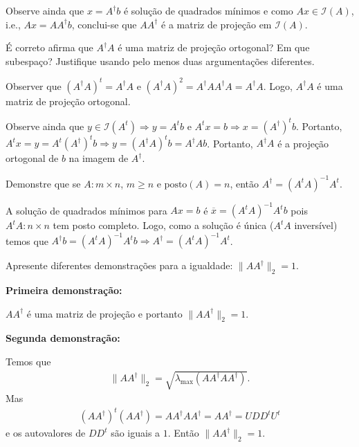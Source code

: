 \begin{questions}
\begin{solution}
        Observe ainda que $x = A^\dagger b$ \'{e} solu\c{c}\~{a}o de quadrados m\'{i}nimos e como $A x \in \mathcal{I}(A)$, i.e., $A x = A A^\dagger b$, conclui-se que $A A^\dagger$ \'{e} a matriz de proje\c{c}\~{a}o em $\mathcal{I}(A)$.
    \end{solution}

    \question \'{E} correto afirma que $A^\dagger A$ \'{e} uma matriz de proje\c{c}\~{a}o ortogonal? Em que subespa\c{c}o? Justifique usando pelo menos duas argumenta\c{c}\~{o}es diferentes.
    \begin{solution}
        Observer que $\left( A^\dagger A \right)^t = A^\dagger A$ e $\left( A^\dagger A \right)^2 = A^\dagger A A^\dagger A = A^\dagger A$. Logo, $A^\dagger A$ \'{e} uma matriz de proje\c{c}\~{a}o ortogonal.

        Observe ainda que $y \in \mathcal{I}(A^t) \Rightarrow y = A^t b$ e $A^t x = b \Rightarrow x = \left( A^\dagger \right)^t b$. Portanto, $A^t x = y = A^t \left( A^\dagger \right)^t b \Rightarrow y = \left( A^\dagger A \right)^t b = A^\dagger A b$. Portanto, $A^\dagger A$ \'{e} a proje\c{c}\~{a}o ortogonal de $b$ na imagem de $A^\dagger$.
    \end{solution}

    \question Demonstre que se $A : m \times n$, $m \geq n$ e $\textrm{posto}(A) = n$, ent\~{a}o $A^\dagger = (A^t A)^{-1} A^t$.
    \begin{solution}
        A solu\c{c}\~{a}o de quadrados m\'{i}nimos para $A x = b$ \'{e} $\overline{x} = \left( A^t A \right)^{-1} A^t b$ pois $A^t A : n \times n$ tem posto completo. Logo, como a solu\c{c}\~{a}o \'{e} \'{u}nica ($A^t A$ invers\'{i}vel) temos que $A^\dagger b = \left( A^t A \right)^{-1} A^t b \Rightarrow A^\dagger = \left( A^t A \right)^{-1} A^t$.
    \end{solution}

    \question Apresente diferentes demonstra\c{c}\~{o}es para a igualdade: $\| A A^\dagger \|_2 = 1$.
    \begin{solution}
        \textbf{Primeira demonstra\c{c}\~{a}o:}

        $A A^\dagger$ \'{e} uma matriz de proje\c{c}\~{a}o e portanto $\| A A^\dagger \|_2 = 1$.

        \textbf{Segunda demonstra\c{c}\~{a}o:}

        Temos que
        \begin{align*}
            \| A A^\dagger \|_2 = \sqrt{\lambda_{\max}(A A^\dagger A A^\dagger)}.
        \end{align*}
        Mas
        \begin{align*}
            \left( A A^\dagger \right)^t \left( A A^\dagger \right) = A A^\dagger A A^\dagger = A A^\dagger = U D D^t U^t
        \end{align*}
        e os autovalores de $D D^t$ s\~{a}o iguais a $1$. Ent\~{a}o $\| A A^\dagger \|_2 = 1$.
    \end{solution}


\end{questions}
